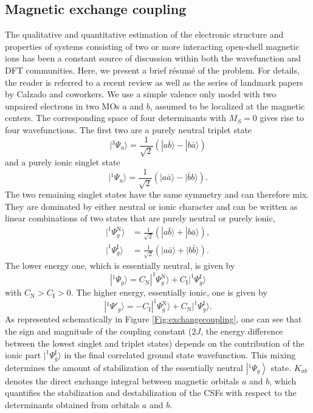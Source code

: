 \subsection{Magnetic exchange coupling}
\label{Sec:Exchange}
The qualitative and quantitative estimation of the electronic structure and properties of systems consisting of two or more interacting open-shell magnetic ions has been a constant source of discussion within both the wavefunction and DFT communities.\cite{HayTH_1975_4884} Here, we present a brief résumé of the problem. For details, the reader is referred to a recent review\cite{MalriCCGG_2014_429} as well as the series of landmark papers by Calzado and coworkers.\cite{CalzaCMC_2002_2728, CalzaCMC_2002_3985, CalzaATCM_2009_44327} We use a simple valence only model with two unpaired electrons in two MOs $a$ and $b$, assumed to be localized at the magnetic centers. The corresponding space of four determinants with $M_S=0$ gives rise to four wavefunctions. The first two are a purely neutral triplet state
\begin{equation}
  |{}^3{\Psi _u}\rangle  = \frac{1}{{\sqrt 2 }}(|a\bar b\rangle  - |b\bar a\rangle )
\end{equation}
and a purely ionic singlet state
\begin{equation}
  |{}^1{\Psi _u}\rangle  = \frac{1}{{\sqrt 2 }}(|a\bar a\rangle  - |\bar bb\rangle ).
\end{equation}
The two remaining singlet states have the same symmetry and can therefore mix. They are dominated by either neutral or ionic character and can be written as linear combinations of two states that are purely neutral or purely ionic, 
\begin{align}
|^1\Psi_g^\text{N}\rangle &= \frac{1}{\sqrt{2}}(|a\bar b\rangle + |b\bar a\rangle),\\
|^1\Psi_g^\text{I}\rangle &= \frac{1}{\sqrt{2}}(|a\bar a\rangle + |b\bar b\rangle).
\end{align}
The lower energy one, which is essentially neutral, is given by 
\begin{equation}
|^1\Psi_g\rangle = C_\text{N} |^1\Psi_g^\text{N}\rangle + C_\text{I} |^1\Psi_g^\text{I}\rangle
\end{equation}
with $C_\text{N}>C_\text{I}>0$. The higher energy, essentially ionic, one is given by
\begin{equation}
|^1\Psi'_g\rangle = -C_\text{I} |^1\Psi_g^\text{N}\rangle + C_\text{N} |^1\Psi_g^\text{I}\rangle.
\end{equation}
As represented schematically in Figure \ref{Fig:exchangecoupling}, one can see that the sign and magnitude of the coupling constant ($2J$, the energy difference between the lowest singlet and triplet states) depends on the contribution of the ionic part $|^1\Psi_g^\text{I}\rangle $ in the final correlated ground state wavefunction. This mixing determines the amount of stabilization of the essentially neutral $\left| {{}^1{\Psi _g}} \right\rangle $ state. $K_{ab}$ denotes the direct exchange integral between magnetic orbitals $a$ and $b$,\cite{CalzaCMC_2002_2728} which quantifies the stabilization and destabilization of the CSFs with respect to the determinants obtained from orbitals $a$ and $b$.
